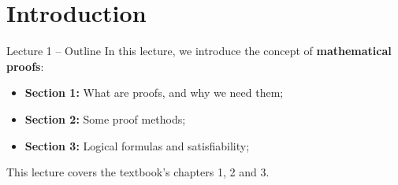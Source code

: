 \section{Introduction}

\begin{frame}{Lecture 1 -- Outline}
  In this lecture, we introduce the concept of {\bf mathematical proofs}:\bigskip

  \begin{itemize}
    \item {\bf Section 1:} What are proofs, and why we need them;
    \item {\bf Section 2:} Some proof methods;
    \item {\bf Section 3:} Logical formulas and satisfiability;
  \end{itemize}


  \bigskip
  \begin{block}{}
  This lecture covers the textbook's chapters 1, 2 and 3.
  \end{block}
\end{frame}
